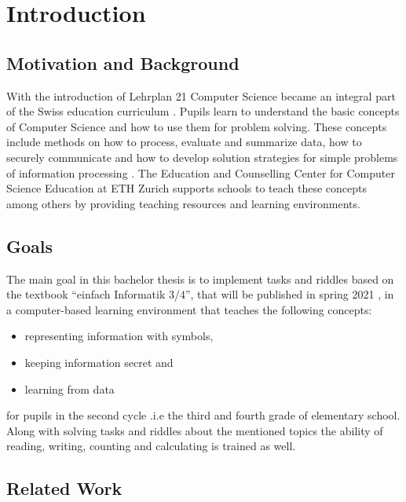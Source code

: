 \chapter{Introduction}

\section{Motivation and Background}

With the introduction of Lehrplan 21 Computer Science became an integral part of the Swiss education curriculum \cite{Lehrplan21}. Pupils learn to understand the basic concepts of Computer Science and how to use them for problem solving. These concepts include methods on how to process, evaluate and summarize data, how to securely communicate and how to develop solution strategies for simple problems of information processing \cite{MedienUndInformatik}. The Education and Counselling Center for Computer Science Education at ETH Zurich \cite{ABZ} supports schools to teach these concepts among others by providing teaching resources and learning environments.

\section{Goals}

The main goal in this bachelor thesis is to implement tasks and riddles based on the textbook “einfach Informatik 3/4”, that will be published in spring 2021 \cite{EinfachInformatik}, in a computer-based learning environment that teaches the following concepts:

\begin{itemize}
    \item representing information with symbols,
    \item keeping information secret and
    \item learning from data
\end{itemize}

for pupils in the second cycle .i.e the third and fourth grade of elementary school.
Along with solving tasks and riddles about the mentioned topics the ability of reading, writing, counting and calculating is trained as well.

\section{Related Work}


